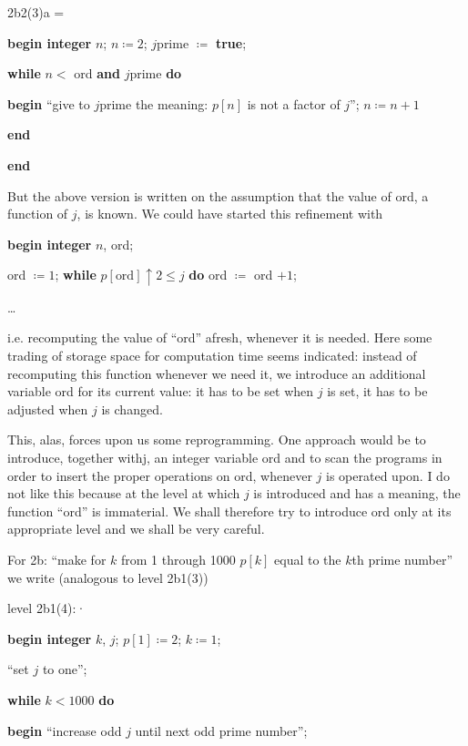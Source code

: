 \noindent
2b2(3)a =

\noindent
\textbf{begin integer} $n$; $n \coloneq 2$; $j$prime $\coloneq$ \textbf{true};

\noindent
\quad\textbf{while} $n <$ ord \textbf{and} $j$prime \textbf{do}

\noindent
\quad\textbf{begin} ``give to $j$prime the meaning: $p[n]$ is not a factor of $j$''; $n \coloneq n + 1$

\noindent
\quad\textbf{end}

\noindent
\textbf{end}

But the above version is written on the assumption that the value of ord, a function of $j$, is known. We could have started this refinement with

\noindent
\textbf{begin integer} $n$, ord;

\noindent
\quad ord $\coloneq 1$; \textbf{while} $p[\text{ord}] \uparrow 2 \leqslant j$ \textbf{do} ord $\coloneq$ ord $+ 1$;

\noindent
\quad \dots

\noindent
i.e. recomputing the value of ``ord'' afresh, whenever it is needed. Here some trading of storage space for computation time seems indicated: instead of recomputing this function whenever we need it, we introduce an additional variable ord for its current value: it has to be set when $j$ is set, it has to be adjusted when $j$ is changed.

This, alas, forces upon us some reprogramming. One approach would be to introduce, together withj, an integer variable ord and to scan the programs in order to insert the proper operations on ord, whenever $j$ is operated upon. I do not like this because at the level at which $j$ is introduced and has a meaning, the function ``ord'' is immaterial. We shall therefore try to introduce ord only at its appropriate level and we shall be very careful.

For 2b: ``make for $k$ from 1 through 1000 $p[k]$ equal to the $k$th prime number'' we write (analogous to level 2b1(3))

\noindent
level 2b1(4):·

\noindent
\textbf{begin integer} $k$, $j$; $p[1] \coloneq 2$; $k \coloneq 1$;

\noindent
\quad ``set $j$ to one'';

\noindent
\quad\textbf{while} $k < 1000$ \textbf{do}

\noindent
\quad\textbf{begin} ``increase odd $j$ until next odd prime number'';

